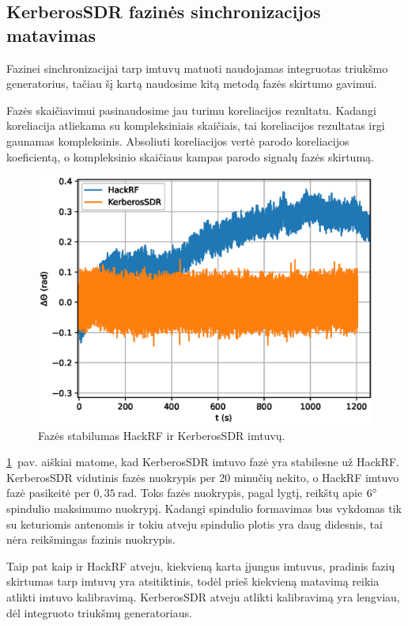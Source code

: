 \documentclass[main.tex]{subfiles}
\begin{document}
\subsection{KerberosSDR fazinės sinchronizacijos matavimas}\label{sec:phase_stability_sdr}

Fazinei sinchronizacijai tarp imtuvų matuoti naudojamas integruotas triukšmo generatorius,
tačiau šį kartą naudosime kitą metodą fazės skirtumo gavimui.

Fazės skaičiavimui pasinaudosime jau turimu koreliacijos rezultatu. Kadangi koreliacija
atliekama su kompleksiniais skaičiais, tai koreliacijos rezultatas irgi gaunamas kompleksinis.
Absoliuti koreliacijos vertė parodo koreliacijos koeficientą, o kompleksinio skaičiaus kampas
parodo signalų fazės skirtumą.

\begin{figure}[h]
    \begin{centering}
    \includegraphics[scale=1.0]{drawings/hackrdf_vs_kerberos_phase_over_time.eps}
    \par\end{centering}
    \protect\caption{\label{fig:phase_stability}Fazės stabilumas HackRF ir KerberosSDR imtuvų.}
\end{figure}

\ref{fig:phase_stability}~pav. aiškiai matome, kad KerberosSDR imtuvo fazė yra 
stabilesne už HackRF. KerberosSDR vidutinis fazės nuokrypis per 20 minučių nekito,
o HackRF imtuvo fazė pasikeitė per $0,35\ \mathrm{rad}$. Toks fazės nuokrypis, pagal
 lygtį, reikštų apie $6\degree$ spindulio maksimumo nuokrypį.
Kadangi spindulio formavimas bus vykdomas tik su keturiomis antenomis ir tokiu atveju
spindulio plotis yra daug didesnis, tai nėra reikšmingas fazinis nuokrypis.

Taip pat kaip ir HackRF atveju, kiekvieną karta įjungus imtuvus, pradinis fazių skirtumas
tarp imtuvų yra atsitiktinis, todėl prieš kiekvieną matavimą reikia atlikti imtuvo kalibravimą.
KerberosSDR atveju atlikti kalibravimą yra lengviau, dėl integruoto triukšmų generatoriaus.
\end{document}

